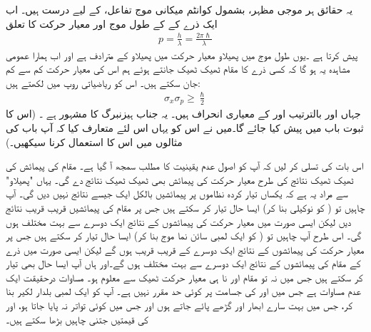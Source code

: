  یہ حقائق ہر موجی مظہر، بشمول کوانٹم میکانی موج تفاعل، کے لیے درست ہیں۔ اب ایک ذرے کے  کے طول موج اور  معیار حرکت کا تعلق  
\begin{align}\label{مساوات_تفاعل_موج_ڈی_بروگلی_معیار_حرکت}
p=\frac{h}{\lambda}=\frac{2\pi\hslash}{\lambda}
\end{align}
پیش کرتا ہے ۔یوں طول موج میں پھیلاو معیار حرکت میں پھیلاو کے مترادف  ہے اور  اب ہمارا عمومی مشاہدہ  یہ  ہو گا کہ کسی ذرے کا مقام ٹھیک ٹھیک جانتے ہوئے ہم اس کی معیار حرکت  کم سے کم  جان سکتے ہیں۔ اس کو ریاضیاتی روپ میں لکھتے ہیں:
\begin{align}\label{مساوات_تفاعل_موج_اصول_عدم_یقینیت}
\sigma_{x}\sigma_{p}\ge\frac{\hslash}{2}
\end{align}
جہاں  اور  بالترتیب  اور  کے معیاری انحراف ہیں۔ یہ جناب ہیزنبرگ کا مشہور   ہے ۔ (اس کا ثبوت  باب  میں پیش کیا جائے گا۔میں نے اس کو یہاں اس لئے متعارف کیا کہ آپ باب  کی مثالوں میں اس کا استعمال کرنا سیکھیں۔)

 اس بات کی تسلی کر لیں کہ آپ کو اصول عدم یقینیت کا مطلب سمجھ آ گیا ہے۔  مقام کی پیمائش کی ٹھیک ٹھیک نتائج کی طرح معیار حرکت کی پیمائش بھی ٹھیک ٹھیک نتائج دے گی۔ یہاں  "پھیلاو" سے مراد یہ ہے کہ یکساں تیار کردہ  نظاموں پر پیمائشیں  بالکل ایک جیسے نتائج  نہیں دیں گی۔  آپ چاہیں تو ( کو نوکیلی بنا کر) ایسا حال تیار کر سکتے ہیں جس پر مقام کی پیمائشیں قریب قریب نتائج  دیں لیکن ایسی صورت میں معیار حرکت کی پیمائشوں کے نتائج ایک دوسرے سے بہت مختلف ہوں گی۔ اس طرح آپ چاہیں تو ( کو ایک لمبی سائن نما موج بنا کر) ایسا حال تیار کر سکتے ہیں جس پر معیار حرکت کی پیمائشوں کے نتائج ایک دوسرے کے قریب قریب ہوں گے لیکن ایسی صورت میں ذرے کے مقام کی پیمائشوں کے نتائج ایک دوسرے سے بہت مختلف ہوں گے۔اور ہاں آپ ایسا حال بھی تیار کر سکتے ہیں جس میں نہ تو مقام  اور نا ہی معیار حرکت ٹھیک سے معلوم ہو۔ مساوات  درحقیقت ایک عدم مساوات ہے جس میں  اور  کی جسامت پر کوئی حد مقرر نہیں ہے۔ آپ  کو ایک لمبی بلدار لکیر بنا کر، جس میں بہت سارے ابھار اور گڑھے پائے جاتے ہوں اور جس میں کوئی تواتر نہ پایا جاتا ہو،  اور  کی قیمتیں جتنی چاہیں بڑھا سکتے ہیں۔

